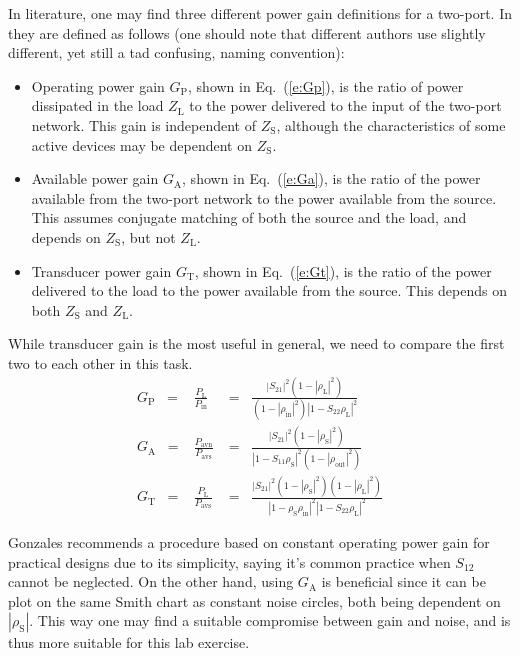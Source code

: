 \documentclass[a4paper, 12pt]{article}
\newcommand{\m}[1]{\mathrm{#1}}
\begin{document}
In literature, one may find three different power gain definitions for a two-port. In 
\cite{pozar} they are defined as follows (one should note that different authors use 
slightly different, yet still a tad confusing, naming convention):
\begin{itemize} \itemsep 0pt
\item Operating power gain $G_\mathrm{P}$, shown in Eq.~(\ref{e:Gp}), is the ratio of 
	power dissipated in the load $Z_\mathrm{L}$ to the power delivered to the input 
	of the two-port network. This gain is independent of $Z_\mathrm{S}$, although the 
	characteristics of some active devices may be dependent on $Z_\mathrm{S}$.

\item Available power gain $G_\mathrm{A}$, shown in Eq.~(\ref{e:Ga}), is the ratio of the 
	power available from the two-port network to the power available from the source. 
	This assumes conjugate matching of both the source and the load, and depends on 
	$Z_\mathrm{S}$, but not $Z_\mathrm{L}$.

\item Transducer power gain $G_\mathrm{T}$, shown in Eq.~(\ref{e:Gt}), is the ratio of 
	the power delivered to the load to the power available from the source. This depends 
	on both $Z_\mathrm{S}$ and $Z_\mathrm{L}$.
\end{itemize}
While transducer gain is the most useful in general, we need to compare the first two to 
each other in this task.
\begin{eqnarray}
G_\m{P} \;\;=& \displaystyle \frac{P_\m{L}}{P_\m{in}} 		&=\;\; \frac{|S_{21}|^2 (1 - |\rho_\m{L}|^2)}{(1 - |\rho_\m{in}|^2)|1 - S_{22}\rho_\m{L}|^2} 									\label{e:Gp} \\
G_\m{A} \;\;=& \displaystyle \frac{P_\m{avn}}{P_\m{avs}} 	&=\;\; \frac{|S_{21}|^2 (1 - |\rho_\m{S}|^2)}{|1 - S_{11}\rho_\m{S}|^2 (1 - |\rho_\m{out}|^2)} 							\label{e:Ga} \\
G_\m{T} \;\;=& \displaystyle \frac{P_\m{L}}{P_\m{avs}} 		&=\;\; \frac{|S_{21}|^2 (1 - |\rho_\m{S}|^2)(1 - |\rho_\m{L}|^2)}{|1 - \rho_\m{S}\rho_\m{in}|^2 |1 - S_{22}\rho_\m{L}|^2}	\label{e:Gt} 
\end{eqnarray}

Gonzales recommends a procedure based on constant operating power gain for practical 
designs due to its simplicity, saying it's common practice when $S_{12}$ cannot be 
neglected. On the other hand, using $G_\mathrm{A}$ is beneficial since it can be plot 
on the same Smith chart as constant noise circles, both being dependent on $|\rho_\mathrm{S}|$. 
This way one may find a suitable compromise between gain and noise, and is thus more 
suitable for this lab exercise.
\end{document}
